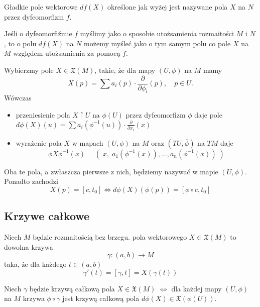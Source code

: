 \begin{definition}
  Gładkie pole wektorowe $df(X)$ określone jak wyżej jest nazywane  pola $X$ na $N$ przez dyfeomorfizm $f$.
\end{definition}

  Jeśli o dyfeomorfiźmie $f$ myślimy jako o sposobie utożsamienia rozmaitości $M$ i $N$, to o polu $df(X)$ na $N$ możemy myśleć jako o tym samym polu co pole $X$ na $M$ względem utożsamienia za pomocą $f$.

\begin{example}
  \item Wybierzmy pole $X\in\mathfrak{X}(M)$, takie, że dla mapy $(U,\phi)$ na $M$ mamy
    $$X(p)=\sum a_i(p)\cdot\frac{\partial}{\partial\phi_i}(p),\quad p\in U.$$
    Wówczas
    \begin{itemize}
      \item przeniesienie pola $X\restriction U$ na $\phi(U)$ przez dyfeomorfizm $\phi$ daje pole $d\phi(X)(u)=\sum a_i(\phi^{-1}(u))\cdot\frac{\partial}{\partial x_i}(x)$
      \item wyrażenie pola $X$ w mapach $(U,\phi)$ na $M$ oraz $(TU,\overline{\phi})$ na $TM$ daje
        $$\overline{\phi}X\phi^{-1}(x)=(\;x,\;a_1(\phi^{-1}(x)),...,a_n(\phi^{-1}(x))\;)$$
    \end{itemize}
    Oba te pola, a zwłaszcza pierwsze z nich, będziemy nazywać  w mapie $(U,\phi)$. Ponadto zachodzi
    $$X(p)=[c,t_0]\iff d\phi(X)(\phi(p))=[\phi\circ c, t_0]$$
\end{example}

\subsection{Krzywe całkowe}

\begin{definition}
  Niech $M$ będzie rozmaitością bez brzegu.  pola wektorowego $X\in\mathfrak{X}(M)$ to dowolna krzywa
  $$\gamma:(a,b)\to M$$
  taka, że dla każdego $t\in (a,b)$
  $$\gamma'(t)=[\gamma, t]=X(\gamma(t))$$
\end{definition}

\begin{lemma}\label{lemat:5.10}
  Niech $\gamma$ będzie krzywą całkową pola $X\in\mathfrak{X}(M)$ $\iff$ dla każdej mapy $(U,\phi)$ na $M$ krzywa $\phi\circ\gamma$ jest krzywą całkową pola $d\phi(X)\in\mathfrak{X}(\phi(U))$.
\end{lemma}

